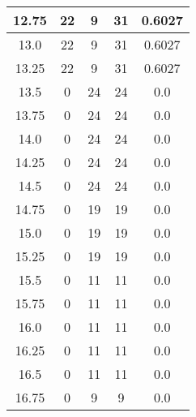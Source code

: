 \documentclass[letterpaper, 12pt]{article}
\begin{document}
\begin{longtable}{|c|c|c|c|c|}
\hline
12.75 & 22 & 9 & 31 & 0.6027 \\
\hline
13.0 & 22 & 9 & 31 & 0.6027 \\
\hline
13.25 & 22 & 9 & 31 & 0.6027 \\
\hline
13.5 & 0 & 24 & 24 & 0.0 \\
\hline
13.75 & 0 & 24 & 24 & 0.0 \\
\hline
14.0 & 0 & 24 & 24 & 0.0 \\
\hline
14.25 & 0 & 24 & 24 & 0.0 \\
\hline
14.5 & 0 & 24 & 24 & 0.0 \\
\hline
14.75 & 0 & 19 & 19 & 0.0 \\
\hline
15.0 & 0 & 19 & 19 & 0.0 \\
\hline
15.25 & 0 & 19 & 19 & 0.0 \\
\hline
15.5 & 0 & 11 & 11 & 0.0 \\
\hline
15.75 & 0 & 11 & 11 & 0.0 \\
\hline
16.0 & 0 & 11 & 11 & 0.0 \\
\hline
16.25 & 0 & 11 & 11 & 0.0 \\
\hline
16.5 & 0 & 11 & 11 & 0.0 \\
\hline
16.75 & 0 & 9 & 9 & 0.0 \\
\hline
\end{longtable}
\end{document}
